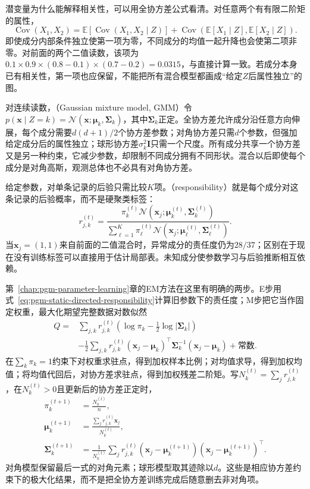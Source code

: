 潜变量为什么能解释相关性，可以用全协方差公式看清。对任意两个有有限二阶矩的属性，
\[
  \operatorname{Cov}(X_1,X_2)=
  \mathbb{E}\!\left[\operatorname{Cov}(X_1,X_2\mid Z)\right]
  +\operatorname{Cov}\!\left(
       \mathbb{E}[X_1\mid Z],\mathbb{E}[X_2\mid Z]\right).
\]
即使成分内部条件独立使第一项为零，不同成分的均值一起升降也会使第二项非零。对前面的两个二值读数，该项为$0.1\times0.9\times(0.8-0.1)\times(0.7-0.2)=0.0315$，与直接计算一致。若成分本身已有相关性，第一项也应保留，不能把所有混合模型都画成“给定$Z$后属性独立”的图。

对连续读数，（Gaussian mixture model, GMM）令$p(\bm{x}\mid Z=k)=\mathcal{N}(\bm{x};\bm{\mu}_k,\bm{\Sigma}_k)$，其中$\bm{\Sigma}_k$正定。全协方差允许成分沿任意方向伸展，每个成分需要$d(d+1)/2$个协方差参数；对角协方差只需$d$个参数，但强加给定成分后的属性独立；球形协方差$\sigma_k^2\bm{I}$只需一个尺度。所有成分共享一个协方差又是另一种约束，它减少参数，却限制不同成分拥有不同形状。混合以后即使每个成分是对角高斯，观测总体也不必具有对角协方差。

给定参数，对单条记录的后验只需比较$K$项。（responsibility）就是每个成分对这条记录的后验概率，而不是硬聚类标签：
\begin{equation}
  \label{eq:pgm-static-directed-responsibility}
  r_{j,k}^{(t)}=
  \frac{\pi_k^{(t)}
      \mathcal{N}(\bm{x}_j;\bm{\mu}_k^{(t)},\bm{\Sigma}_k^{(t)})}
       {\sum_{\ell=1}^{K}\pi_\ell^{(t)}
      \mathcal{N}(\bm{x}_j;\bm{\mu}_\ell^{(t)},\bm{\Sigma}_\ell^{(t)})}.
\end{equation}
当$\bm{x}_j=(1,1)$来自前面的二值混合时，异常成分的责任度仍为$28/37$；区别在于现在没有训练标签可以直接用于估计局部表。未知成分使参数学习与后验推断相互依赖。

第~\ref{chap:pgm-parameter-learning}章的EM方法在这里有明确的两步。E步用式~\eqref{eq:pgm-static-directed-responsibility}计算旧参数下的责任度；M步把它当作固定权重，最大化期望完整数据对数似然
\[
  \begin{aligned}
    Q={}&\sum_{j,k}r_{j,k}^{(t)}
       \left(\log\pi_k-\frac12\log|\bm{\Sigma}_k|\right)\\
       &-\frac12\sum_{j,k}r_{j,k}^{(t)}
         (\bm{x}_j-\bm{\mu}_k)^\top
          \bm{\Sigma}_k^{-1}(\bm{x}_j-\bm{\mu}_k)
       +\text{常数}.
  \end{aligned}
\]
在$\sum_k\pi_k=1$约束下对权重求驻点，得到加权样本比例；对均值求导，得到加权均值；将均值代回后，对协方差求驻点，得到加权残差二阶矩。写$N_k^{(t)}=\sum_jr_{j,k}^{(t)}$，在$N_k^{(t)}>0$且更新后的协方差正定时，
\begin{equation}
  \label{eq:pgm-static-directed-gmm-em}
  \begin{aligned}
    \pi_k^{(t+1)}&=\frac{N_k^{(t)}}{n},\\
    \bm{\mu}_k^{(t+1)}
      &=\frac{\sum_jr_{j,k}^{(t)}\bm{x}_j}{N_k^{(t)}},\\
    \bm{\Sigma}_k^{(t+1)}
      &=\frac{1}{N_k^{(t)}}\sum_jr_{j,k}^{(t)}
       (\bm{x}_j-\bm{\mu}_k^{(t+1)})
       (\bm{x}_j-\bm{\mu}_k^{(t+1)})^\top.
  \end{aligned}
\end{equation}
对角模型保留最后一式的对角元素；球形模型取其迹除以$d$。这些是相应协方差约束下的极大化结果，而不是把全协方差训练完成后随意删去非对角项。

